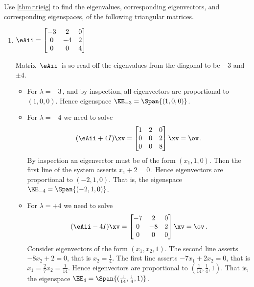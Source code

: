 \begin{example} \label{eg:trieig}
Use \cref{thm:trieig} to find the eigenvalues, corresponding eigenvectors, and corresponding eigenspaces, of the following triangular matrices.
\begin{enumerate}
\item \(\eAii=\begin{bmatrix}-3&2&0
\\0&-4&2
\\0&0&4\end{bmatrix}\)
\begin{solution} 
Matrix~\(\eAii\)\ is  so read off the eigenvalues from the diagonal to be \(-3\) and~\(\pm 4\).
\begin{itemize}
\item For \(\lambda=-3\)\,, and by inspection, all eigenvectors are proportional to \((1,0,0)\).
Hence eigenspace \(\EE_{-3}=\Span\{(1,0,0)\}\).
\item For \(\lambda=-4\) we need to solve
\begin{equation*}
(\eAii+4I)\xv=
\begin{bmatrix}1&2&0
\\0&0&2
\\0&0&8\end{bmatrix}\xv=\ov\,.
\end{equation*}
By inspection an eigenvector must be of the form \((x_1,1,0)\).
Then the first line of the system asserts \(x_1+2=0\)\,.
Hence eigenvectors are proportional to \((-2,1,0)\).
That is, the eigenspace \(\EE_{-4}=\Span\{(-2,1,0)\}\).
\item For \(\lambda=+4\) we need to solve
\begin{equation*}
(\eAii-4I)\xv=
\begin{bmatrix}-7&2&0
\\0&-8&2
\\0&0&0\end{bmatrix}\xv=\ov\,.
\end{equation*}
Consider eigenvectors of the form \((x_1,x_2,1)\).
The second line asserts \(-8x_2+2=0\), that is \(x_2=\frac14\).
The first line asserts \(-7x_1+2x_2=0\), that is \(x_1=\frac27x_2=\frac1{14}\).
Hence eigenvectors are proportional to \((\frac1{14},\frac14,1)\).
That is, the eigenspace \(\EE_{4}=\Span\{(\frac1{14},\frac14,1)\}\).
\end{itemize}
\end{solution}


\end{enumerate}
\end{example}
